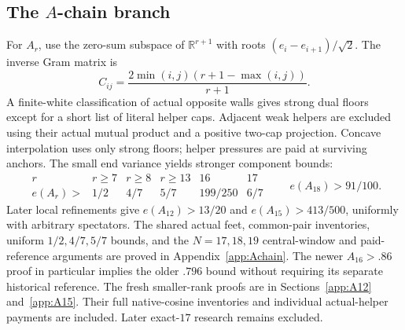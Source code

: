 \documentclass[11pt]{article}
\theoremstyle{definition}
\theoremstyle{remark}
\newcommand{\R}{\mathbb R}
\begin{document}
\subsection[The A-chain branch]{The \(A\)-chain branch}
For \(A_r\), use the zero-sum subspace of \(\R^{r+1}\) with roots
\((e_i-e_{i+1})/\sqrt2\). The inverse Gram matrix is
\[
 C_{ij}=\frac{2\min(i,j)(r+1-\max(i,j))}{r+1}.
\]
A finite-white classification of actual opposite walls gives
strong dual floors except for a short list of literal helper caps.
Adjacent weak helpers are excluded using their actual mutual
product and a positive two-cap projection. Concave interpolation
uses only strong floors; helper pressures are paid at surviving
anchors. The small end variance yields stronger component bounds:
\[
\begin{array}{c|ccccc}
r&r\geq7&r\geq8&r\geq13&16&17\\ \hline
e(A_r)>&1/2&4/7&5/7&199/250&6/7
\end{array}
\qquad e(A_{18})>91/100.
\]
Later local refinements give \(e(A_{12})>13/20\) and
\(e(A_{15})>413/500\), uniformly with arbitrary spectators.
The shared actual feet, common-pair inventories, uniform
\(1/2,4/7,5/7\) bounds, and the \(N=17,18,19\) central-window
and paid-reference arguments are proved in Appendix~\ref{app:Achain}.
The newer \(A_{16}>.86\) proof in particular implies the older
\(.796\) bound without requiring its separate historical reference.
The fresh smaller-rank proofs are in Sections~\ref{app:A12}
and~\ref{app:A15}. Their full native-cosine inventories and
individual actual-helper payments are included. Later exact-\(17\)
research remains excluded.
\end{document}
